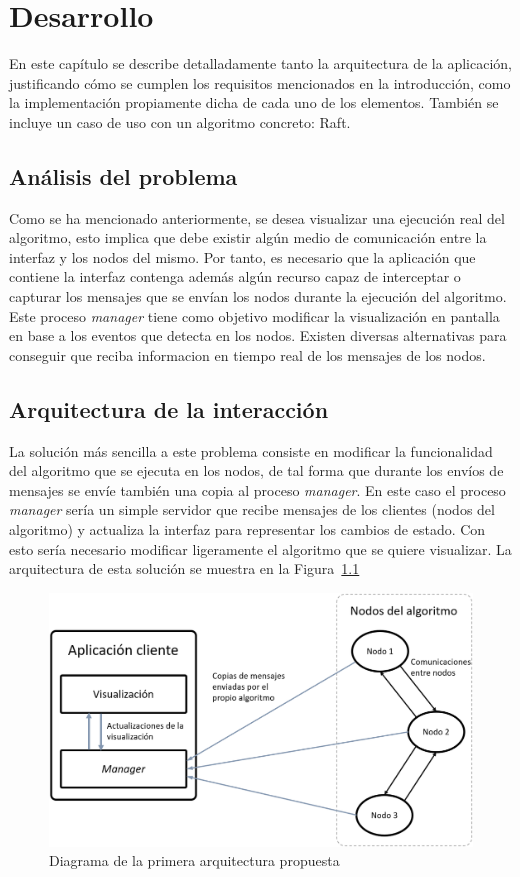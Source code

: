 \chapter{Desarrollo}

En este capítulo se describe detalladamente tanto la arquitectura de la aplicación, justificando cómo se cumplen los requisitos mencionados en la introducción, como la implementación propiamente dicha de cada uno de los elementos. También se incluye un caso de uso con un algoritmo concreto: Raft.

\section{Análisis del problema}

Como se ha mencionado anteriormente, se desea visualizar una ejecución real del algoritmo, esto implica que debe existir algún medio de comunicación entre la interfaz y los nodos del mismo. Por tanto, es necesario que la aplicación que contiene la interfaz contenga además algún recurso capaz de interceptar o capturar los mensajes que se envían los nodos durante la ejecución del algoritmo. Este proceso \textit{manager} tiene como objetivo modificar la visualización en pantalla en base a los eventos que detecta en los nodos. Existen diversas alternativas para conseguir que reciba informacion en tiempo real de los mensajes de los nodos.

\section{Arquitectura de la interacción}
\label{sec:arquitectura}

La solución más sencilla a este problema consiste en modificar la funcionalidad del algoritmo que se ejecuta en los nodos, de tal forma que durante los envíos de mensajes se envíe también una copia al proceso \textit{manager}. En este caso el proceso \textit{manager} sería un simple servidor que recibe mensajes de los clientes (nodos del algoritmo) y actualiza la interfaz para representar los cambios de estado. Con esto sería necesario modificar ligeramente el algoritmo que se quiere visualizar. La arquitectura de esta solución se muestra en la Figura~\ref{fig:arquitectura1}

\newpage

\begin{figure}[h]
  \centering
  \includegraphics[width=0.7\linewidth]{imagenes/arquitectura1}
  \caption{Diagrama de la primera arquitectura propuesta}
  \label{fig:arquitectura1}
\end{figure}

